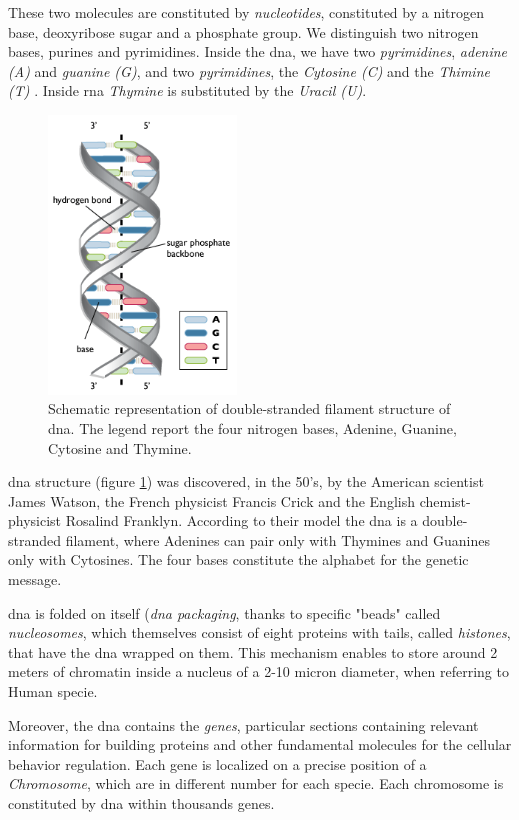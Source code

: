 These two molecules are constituted by \textit{nucleotides}, constituted by a nitrogen base, deoxyribose sugar and a phosphate group.
We distinguish two nitrogen bases, purines and pyrimidines.
Inside the \gls{dna}, we have two \textit{pyrimidines}, \textit{adenine (A)} and \textit{guanine (G)}, and two \textit{pyrimidines}, the \textit{Cytosine (C)} and the \textit{Thimine (T)}  .
Inside \gls{rna} \textit{Thymine} is substituted by the \textit{Uracil (U)}.

\begin{figure}[h]
\centering
\includegraphics[width=5cm, keepaspectratio]{img/intro/dna1.png}
\caption[the \gls{dna}]{Schematic representation of double-stranded filament structure of \gls{dna}. The legend report the four nitrogen bases, Adenine, Guanine, Cytosine and Thymine.}
\label{fig:dna}
\end{figure}

\gls{dna} structure (figure \ref{fig:dna}) was discovered, in the 50's, by the American scientist James Watson, the French physicist Francis Crick and the English chemist-physicist Rosalind Franklyn.
According to their model the \gls{dna} is a double-stranded filament, where Adenines can pair only with Thymines and Guanines only with Cytosines.
The four bases constitute the alphabet for the genetic message.

\gls{dna} is folded on itself (\textit{\gls{dna} packaging}, thanks to specific "beads" called \textit{nucleosomes}, which themselves consist of eight proteins with tails, called \textit{histones}, that have the \gls{dna} wrapped on them.
This mechanism enables to store around 2 meters of chromatin inside a nucleus of a 2-10 micron diameter, when referring to Human specie.

Moreover, the \gls{dna} contains the \textit{genes}, particular sections containing relevant information for building proteins and other fundamental molecules for the cellular behavior regulation.
Each gene is localized on a precise position of a \textit{Chromosome}, which are in different number for each specie.
Each chromosome is constituted by \gls{dna} within thousands genes.


